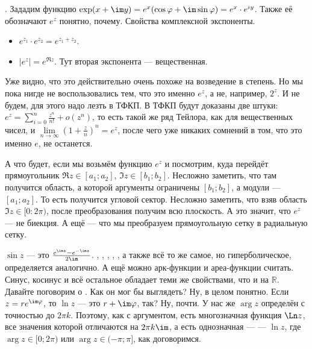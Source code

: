 \documentclass{article}
\begin{document}
\begin{itemize}
\begin{Proof}
        \end{Proof}
        \dfn {}. Зададим функцию $\exp(x+\im y)=e^x(\cos\varphi+\im\sin\varphi)=e^x\cdot e^{iy}$. Также её обозначают $e^z$ понятно, почему.
        \thm Свойства комплексной экспоненты.
        \begin{itemize}
            \item $e^{z_1}\cdot e^{z_2}=e^{z_1+z_2}$.
            \item $|e^z|=e^{\Re z}$. Тут вторая экспонента --- вещественная.
        \end{itemize}
        \begin{Comment}
            Уже видно, что это действительно очень похоже на возведение в степень. Но мы пока нигде не воспользовались тем, что это именно $e^z$, а не, например, $2^z$. И не будем, для этого надо лезть в ТФКП. В ТФКП будут доказаны две штуки: $e^z=\sum_{i=0}^n\frac{z^n}{n!}+o(z^n)$, то есть такой же ряд Тейлора, как для вещественных чисел, и $\lim\limits_{n\to\infty}\left(1+\frac zn\right)^n=e^z$, после чего уже никаких сомнений в том, что это именно $e$, не останется.
        \end{Comment}
        \begin{Comment}
            А что будет, если мы возьмём функцию $e^z$ и посмотрим, куда перейдёт прямоугольник $\Re z\in[a_1;a_2]$, $\Im z\in[b_1;b_2]$. Несложно заметить, что там получится область, а которой аргументы ограничены $[b_1;b_2]$, а модули --- $[a_1;a_2]$. То есть получится угловой сектор. Несложно заметить, что взяв область $\Im z\in[0:2\pi)$, после преобразования получим всю плоскость. А это значит, что $e^z$ --- не биекция. А ещё --- что мы преобразуем прямоугольную сетку в радиальную сетку.
        \end{Comment}
        \dfn {} $\sin z$ --- это $\frac{e^{\im z}-e^{-\im z}}{2\im}$. , , , , , а также всё то же самое, но гиперболическое, определяется аналогично. А ещё можно арк-функции и ареа-функции считать.
        \thm Синус, косинус и всё остальное обладает теми же свойствами, что и на $\mathbb R$.
        \dfn Давайте поговорим о . Как он мог бы выглядеть? Ну, в целом понятно. Если $z=re^{\im\varphi}$, то $\ln z$ --- это $r+\im\varphi$, так? Ну, почти. У нас же $\arg z$ определён с точностью до $2\pi k$. Поэтому, как с аргументом, есть многозначная функция $\Ln z$, все значения которой отличаются на $2\pi k\im$, а есть однозначная ---  --- $\ln z$, где $\arg z\in[0;2\pi)$ или $\arg z\in(-\pi;\pi]$, как договоримся.

\end{itemize}
\end{document}
